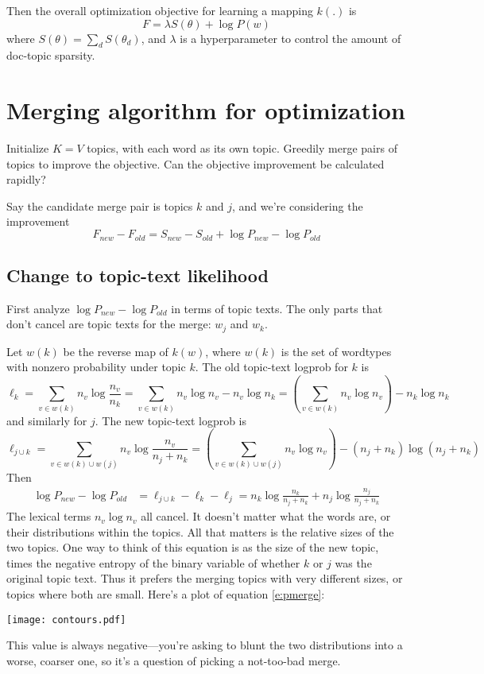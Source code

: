 \documentclass[11pt,letterpaper]{article}
\theoremstyle{definition}
\begin{document}
Then the overall optimization objective for learning a mapping $k(.)$ is
\[ F = \lambda S(\theta) + \log P(w) \]
where $S(\theta) = \sum_d S(\theta_d)$, and $\lambda$ is a hyperparameter to control the amount of doc-topic sparsity.

\section{Merging algorithm for optimization}

Initialize $K=V$ topics, with each word as its own topic.  Greedily merge pairs of topics to improve the objective.  Can the objective improvement be calculated rapidly?

Say the candidate merge pair is topics $k$ and $j$, and we're considering the improvement 
\[F_{new}-F_{old} = S_{new}-S_{old} + \log P_{new}-\log P_{old}\]

\subsection{Change to topic-text likelihood}
First analyze $\log P_{new}-\log P_{old}$ in terms of topic texts. The only parts that don't cancel are topic texts for the merge: $w_j$ and $w_k$.

Let $w(k)$ be the reverse map of $k(w)$, where $w(k)$ is the set of wordtypes with nonzero probability under topic $k$.
The old topic-text logprob for $k$ is 
 \[ \ell_k = \sum_{v \in w(k)} n_v \log \frac{n_v}{n_k} 
  = \sum_{v\in w(k)} n_v \log n_v - n_v \log n_k
  = \left(\sum_{v\in w(k)} n_v \log n_v\right) - n_k \log n_k
  \]
and similarly for $j$.  The new topic-text logprob is
  \[\ell_{j \cup k} = \sum_{v \in w(k) \cup w(j)} n_v \log \frac{n_v}{n_j+n_k} = 
    \left(\sum_{v \in w(k) \cup w(j)} n_v \log  n_v\right) - (n_j+n_k) \log (n_j+n_k)\]
Then
\begin{align}
  \log P_{new}-\log P_{old} 
  &= \ell_{j \cup k} - \ell_k - \ell_j
=
  n_k \log \frac{n_k}{n_j+n_k} + n_j \log \frac{n_j}{n_j+n_k} \label{e:pmerge}
\end{align}
The lexical terms $n_v \log n_v$ all cancel.  It doesn't matter what the words are, or their distributions within the topics.  All that matters is the relative sizes of the two topics.  One way to think of this equation is as the size of the new topic, times the negative entropy of the binary variable of whether $k$ or $j$ was the original topic text.  Thus it prefers the merging topics with very different sizes, or topics where both are small.  Here's a plot of equation \ref{e:pmerge}:
\begin{center}
\texttt{[image: contours.pdf]}
\end{center}
This value is always negative---you're asking to blunt the two distributions into a worse, coarser one, so it's a question of picking a not-too-bad merge.
\end{document}
